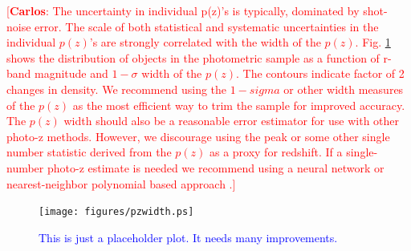 \documentclass[preprint]{aastex}
\newcommand{\cc}[1]{\textcolor{red}{[{\bf Carlos}: #1]}}
\begin{document}
\cc{The uncertainty in individual p(z)'s is typically, dominated by shot-noise error.
The scale of both statistical and systematic uncertainties in the individual $p(z)$'s 
are strongly correlated with the width of the $p(z)$.
Fig. \ref{fig:pzwidth} shows the distribution of objects in the photometric sample as
a function of r-band magnitude and $1-\sigma$ width of the $p(z)$.
The contours indicate factor of 2 changes in density.
We recommend using the $1-sigma$ or other width measures of the $p(z)$ as the most efficient 
way to trim the sample for improved accuracy.
The $p(z)$ width should also be a reasonable error estimator for use with other photo-z methods.
However, we discourage using the peak or some other single number statistic derived from the $p(z)$
as a proxy for redshift. 
If a single-number photo-z estimate is needed we recommend using a neural network or nearest-neighbor
polynomial based approach  \cite[e.g.][]{Oyaizu08}.} 
\begin{figure}[!t]\centering
    \texttt{[image: figures/pzwidth.ps]}
    \caption{\textcolor{blue}{This is just a placeholder plot. It needs many improvements.}}
    \label{fig:pzwidth}

    \vspace{2em}
\end{figure}



\end{document}
